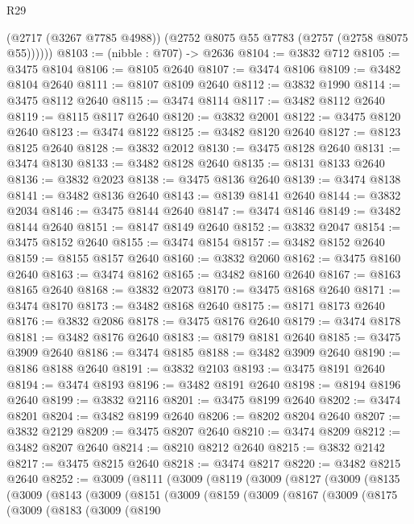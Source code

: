 \begin{lexlean}{R29}
\begin{coremodule}
          (@2717 (@3267 @7785 @4988))
          (@2752 @8075 @55 @7783 (@2757 (@2758 @8075 @55))))))
@8103 := (nibble : @707) -> @2636
@8104 := @3832 @712
@8105 := @3475 @8104
@8106 := @8105 @2640
@8107 := @3474 @8106
@8109 := @3482 @8104 @2640
@8111 := @8107 @8109 @2640
@8112 := @3832 @1990
@8114 := @3475 @8112 @2640
@8115 := @3474 @8114
@8117 := @3482 @8112 @2640
@8119 := @8115 @8117 @2640
@8120 := @3832 @2001
@8122 := @3475 @8120 @2640
@8123 := @3474 @8122
@8125 := @3482 @8120 @2640
@8127 := @8123 @8125 @2640
@8128 := @3832 @2012
@8130 := @3475 @8128 @2640
@8131 := @3474 @8130
@8133 := @3482 @8128 @2640
@8135 := @8131 @8133 @2640
@8136 := @3832 @2023
@8138 := @3475 @8136 @2640
@8139 := @3474 @8138
@8141 := @3482 @8136 @2640
@8143 := @8139 @8141 @2640
@8144 := @3832 @2034
@8146 := @3475 @8144 @2640
@8147 := @3474 @8146
@8149 := @3482 @8144 @2640
@8151 := @8147 @8149 @2640
@8152 := @3832 @2047
@8154 := @3475 @8152 @2640
@8155 := @3474 @8154
@8157 := @3482 @8152 @2640
@8159 := @8155 @8157 @2640
@8160 := @3832 @2060
@8162 := @3475 @8160 @2640
@8163 := @3474 @8162
@8165 := @3482 @8160 @2640
@8167 := @8163 @8165 @2640
@8168 := @3832 @2073
@8170 := @3475 @8168 @2640
@8171 := @3474 @8170
@8173 := @3482 @8168 @2640
@8175 := @8171 @8173 @2640
@8176 := @3832 @2086
@8178 := @3475 @8176 @2640
@8179 := @3474 @8178
@8181 := @3482 @8176 @2640
@8183 := @8179 @8181 @2640
@8185 := @3475 @3909 @2640
@8186 := @3474 @8185
@8188 := @3482 @3909 @2640
@8190 := @8186 @8188 @2640
@8191 := @3832 @2103
@8193 := @3475 @8191 @2640
@8194 := @3474 @8193
@8196 := @3482 @8191 @2640
@8198 := @8194 @8196 @2640
@8199 := @3832 @2116
@8201 := @3475 @8199 @2640
@8202 := @3474 @8201
@8204 := @3482 @8199 @2640
@8206 := @8202 @8204 @2640
@8207 := @3832 @2129
@8209 := @3475 @8207 @2640
@8210 := @3474 @8209
@8212 := @3482 @8207 @2640
@8214 := @8210 @8212 @2640
@8215 := @3832 @2142
@8217 := @3475 @8215 @2640
@8218 := @3474 @8217
@8220 := @3482 @8215 @2640
@8252 := @3009
    (@8111
      (@3009
        (@8119
          (@3009
            (@8127
              (@3009
                (@8135
                  (@3009
                    (@8143
                      (@3009
                        (@8151
                          (@3009
                            (@8159
                              (@3009
                                (@8167
                                  (@3009
                                    (@8175
                                      (@3009
                                        (@8183
                                          (@3009
                                            (@8190

\end{coremodule}
\end{lexlean}
